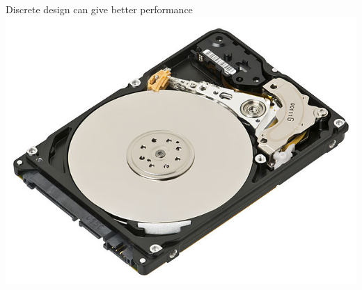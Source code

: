 \documentclass[presentation,aspectratio=169]{beamer}
\begin{document}
\begin{frame}[label=sec-1-5]{Discrete design can give better performance}
\includegraphics[height=0.5\textheight]{../figures/diskdrive.png}
\end{frame}
\end{document}
